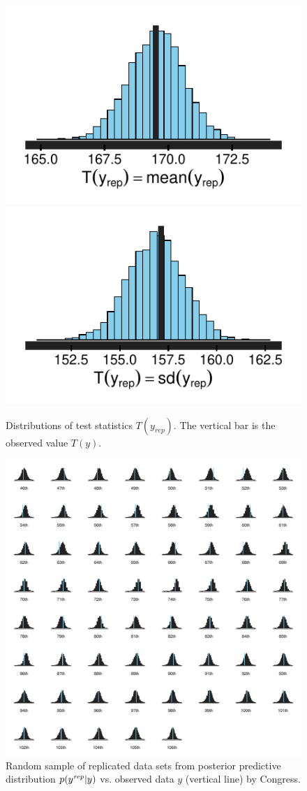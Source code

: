 \begin{figure}
\centering
	\includegraphics[scale=0.75]{sections/figs/test_stats_mean}
	\includegraphics[scale=0.75]{sections/figs/test_stats_sd}
\caption{Distributions of test statistics $T(y_{rep})$. The vertical bar is the observed value $T(y)$.}
\label{fig:ck_pp_test_statistics}
\end{figure}

\begin{figure}
\centering
	\includegraphics[scale=0.8]{sections/figs/ck_pp_nWins_hists}
\caption{Random sample of replicated data sets from posterior predictive distribution $p(y^{\it rep} | y)$ vs. observed data $y$ (vertical line) by Congress.}
\label{fig:ck_pp_nWins_hists}
\end{figure}


